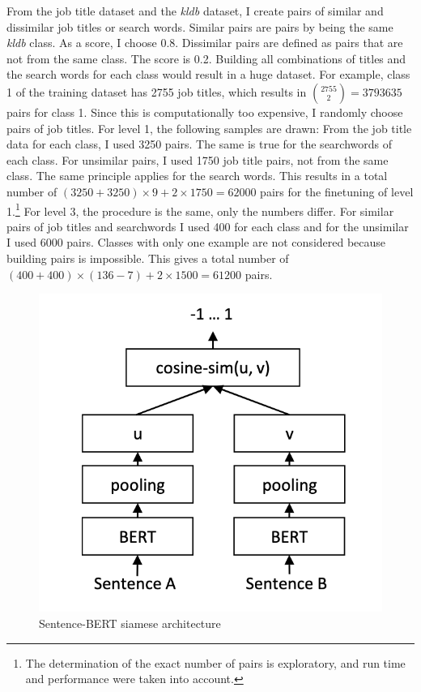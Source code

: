 \documentclass[12pt, a4paper, titlepage]{article}
\begin{document}
From the job title dataset and the \textit{kldb} dataset, I create pairs of similar and dissimilar job titles or search words. Similar pairs are pairs by being the same \textit{kldb} class. As a score, I choose 0.8. Dissimilar pairs are defined as pairs that are not from the same class. The score is 0.2. Building all combinations of titles and the search words for each class would result in a huge dataset. For example, class 1 of the training dataset has 2755 job titles, which results in ${2755 \choose 2} = 3793635$ pairs for class 1. Since this is computationally too expensive, I randomly choose pairs of job titles. For level 1, the following samples are drawn: From the job title data for each class, I used 3250 pairs. The same is true for the searchwords of each class. For unsimilar pairs, I used 1750 job title pairs, not from the same class. The same principle applies for the search words. This results in a total number of $(3250+3250) \times 9 + 2 \times 1750 = 62000$ pairs for the finetuning of level 1.\footnote{The determination of the exact number of pairs is exploratory, and run time and performance were taken into account.} For level 3, the procedure is the same, only the numbers differ. For similar pairs of job titles and searchwords I used 400 for each class and for the unsimilar I used 6000 pairs. Classes with only one example are not considered because building pairs is impossible. This gives a total number of $(400 + 400) \times (136-7) + 2 \times 1500 =  61200$ pairs. 

\begin{figure}[hb!]
  \center
  \includegraphics[scale=0.5]{SBERT.png}
  \caption[Sentence-BERT siamese structure]{\label{fig: F5} Sentence-\ac{BERT} siamese architecture \citep[3]{reimers2019}}
\end{figure}
\end{document}
